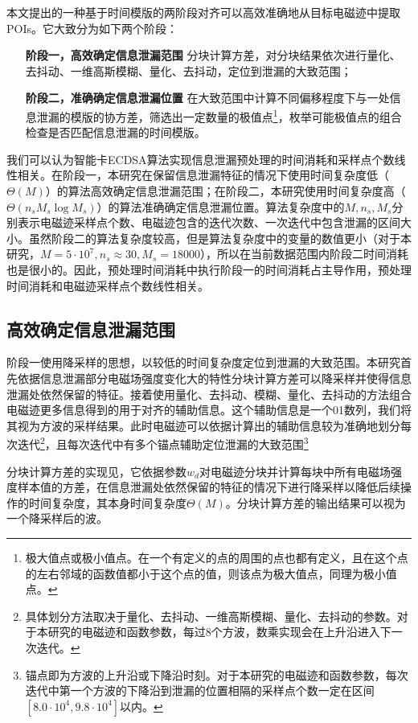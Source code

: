 {	本文提出的一种基于时间模版的两阶段对齐可以高效准确地从目标电磁迹中提取POIs。它大致分为如下两个阶段：
	
	\begin{itemize}
		\item [\textbf{阶段一，高效确定信息泄漏范围}]分块计算方差，对分块结果依次进行量化、去抖动、一维高斯模糊、量化、去抖动，定位到泄漏的大致范围；
		\item [\textbf{阶段二，准确确定信息泄漏位置}]在大致范围中计算不同偏移程度下与一处信息泄漏的模版的协方差，筛选出一定数量的极值点\footnote{极大值点或极小值点。在一个有定义的点的周围的点也都有定义，且在这个点的左右邻域的函数值都小于这个点的值，则该点为极大值点，同理为极小值点。}，枚举可能极值点的组合检查是否匹配信息泄漏的时间模版。
	\end{itemize}

	我们可以认为智能卡ECDSA算法实现信息泄漏预处理的时间消耗和采样点个数线性相关。在阶段一，本研究在保留信息泄漏特征的情况下使用时间复杂度低（$\Theta(M)$）的算法高效确定信息泄漏范围；在阶段二，本研究使用时间复杂度高（$\Theta(n_sM_s\log M_s)$）的算法准确确定信息泄漏位置。算法复杂度中的$M,n_s,M_s$分别表示电磁迹采样点个数、电磁迹包含的迭代次数、一次迭代中包含泄漏的区间大小。虽然阶段二的算法复杂度较高，但是算法复杂度中的变量的数值更小（对于本研究，$M=5\cdot10^7,n_s\approx 30,M_s=18000$），所以在当前数据范围内阶段二时间消耗也是很小的。因此，预处理时间消耗中执行阶段一的时间消耗占主导作用，预处理时间消耗和电磁迹采样点个数线性相关。

	\subsection{高效确定信息泄漏范围}\label{subs:phase1}
	阶段一使用降采样的思想，以较低的时间复杂度定位到泄漏的大致范围。本研究首先依据信息泄漏部分电磁场强度变化大的特性分块计算方差可以降采样并使得信息泄漏处依然保留的特征。接着使用量化、去抖动、模糊、量化、去抖动的方法组合电磁迹更多信息得到的用于对齐的辅助信息。这个辅助信息是一个01数列，我们将其视为方波的采样结果。此时电磁迹可以依据计算出的辅助信息较为准确地划分每次迭代\footnote{具体划分方法取决于量化、去抖动、一维高斯模糊、量化、去抖动的参数。对于本研究的电磁迹和函数参数，每过8个方波，数乘实现会在上升沿进入下一次迭代。}，且每次迭代中有多个锚点辅助定位泄漏的大致范围\footnote{锚点即为方波的上升沿或下降沿时刻。对于本研究的电磁迹和函数参数，每次迭代中第一个方波的下降沿到泄漏的位置相隔的采样点个数一定在区间$[8.0\cdot10^{4},9.8\cdot10^{4}]$以内。}
	
	分块计算方差的实现见，它依据参数$w_d$对电磁迹分块并计算每块中所有电磁场强度样本值的方差，在信息泄漏处依然保留的特征的情况下进行降采样以降低后续操作的时间复杂度，其本身时间复杂度$\Theta(M)$。分块计算方差的输出结果可以视为一个降采样后的波。
	
}
